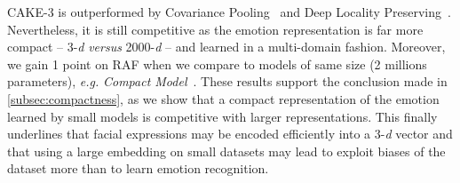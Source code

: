 \documentclass{bmvc2k}
\begin{document}
CAKE-3 is outperformed by Covariance Pooling~\cite{acharya_covariance_2018} and Deep Locality Preserving~\cite{li_reliable_2017}.
Nevertheless, it is still competitive as the emotion representation is far more compact -- 3-\textit{d} \textit{versus} 2000-\textit{d} -- and learned in a multi-domain fashion. Moreover, we gain 1 point on RAF when we compare to models of same size (2 millions parameters), \textit{e.g.} \textit{Compact Model}~\cite{kuo2018compact}. These results support the conclusion made in \ref{subsec:compactness}, as we show that a compact representation of the emotion learned by small models is competitive with larger representations. This finally underlines that facial expressions may be encoded efficiently into a 3-\textit{d} vector and that using a large embedding on small datasets may lead to exploit biases of the dataset more than to learn emotion recognition.
\end{document}

